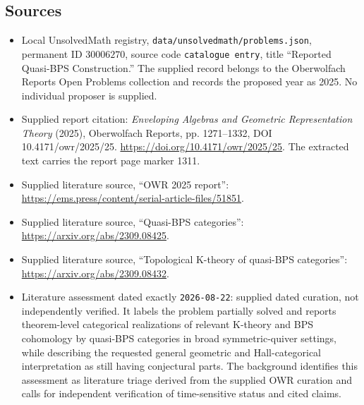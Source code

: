 \documentclass[11pt]{article}
\begin{document}
\subsection{Sources}
\begin{itemize}
\item Local UnsolvedMath registry, \texttt{data/unsolvedmath/problems.json}, permanent ID \(30006270\), source code \texttt{catalogue entry}, title ``Reported Quasi-BPS Construction.'' The supplied record belongs to the Oberwolfach Reports Open Problems collection and records the proposed year as 2025. No individual proposer is supplied.
\item Supplied report citation: \emph{Enveloping Algebras and Geometric Representation Theory} (2025), Oberwolfach Reports, pp. 1271--1332, DOI 10.4171/owr/2025/25. \url{https://doi.org/10.4171/owr/2025/25}. The extracted text carries the report page marker 1311.
\item Supplied literature source, ``OWR 2025 report'': \url{https://ems.press/content/serial-article-files/51851}.
\item Supplied literature source, ``Quasi-BPS categories'': \url{https://arxiv.org/abs/2309.08425}.
\item Supplied literature source, ``Topological K-theory of quasi-BPS categories'': \url{https://arxiv.org/abs/2309.08432}.
\item Literature assessment dated exactly \texttt{2026-08-22}: supplied dated curation, not independently verified. It labels the problem partially solved and reports theorem-level categorical realizations of relevant K-theory and BPS cohomology by quasi-BPS categories in broad symmetric-quiver settings, while describing the requested general geometric and Hall-categorical interpretation as still having conjectural parts. The background identifies this assessment as literature triage derived from the supplied OWR curation and calls for independent verification of time-sensitive status and cited claims.
\end{itemize}
\end{document}
